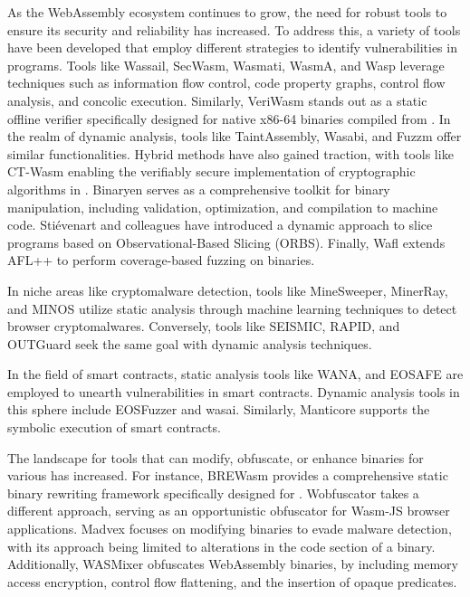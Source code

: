 \vspace{10mm}
As the WebAssembly ecosystem continues to grow, the need for robust tools to ensure its security and reliability has increased. 
To address this, a variety of tools have been developed that employ different strategies to identify vulnerabilities in \Wasm programs. 
Tools like Wassail\cite{wassail}, SecWasm\cite{secwasm}, Wasmati\cite{wasmati}, WasmA\cite{wasma}, and Wasp\cite{Wasp} leverage techniques such as information flow control, code property graphs, control flow analysis, and concolic execution. 
Similarly, VeriWasm\cite{veriwasm} stands out as a static offline verifier specifically designed for native x86-64 binaries compiled from \Wasm. 
In the realm of dynamic analysis, tools like TaintAssembly\cite{taintassembly}, Wasabi\cite{wasabi}, and Fuzzm\cite{fuzzm} offer similar functionalities. 
Hybrid methods have also gained traction, with tools like CT-Wasm\cite{ctwasm} enabling the verifiably secure implementation of cryptographic algorithms in \Wasm. 
Binaryen serves as a comprehensive toolkit for \Wasm binary manipulation, including validation, optimization, and compilation to machine code. 
Stiévenart and colleagues have introduced a dynamic approach to slice \Wasm programs based on Observational-Based Slicing (ORBS)\cite{slicing, slicing2}. 
Finally, Wafl\cite{wafl} extends AFL++ to perform coverage-based fuzzing on \Wasm binaries.


 In niche areas like cryptomalware detection, tools like MineSweeper\cite{Minesweeper}, MinerRay\cite{MinerRay}, and MINOS\cite{MINOS} utilize static analysis through machine learning techniques to detect browser cryptomalwares. 
Conversely, tools like SEISMIC\cite{SEISMIC}, RAPID\cite{RAPID}, and OUTGuard\cite{outguard} seek the same goal with dynamic analysis techniques.

 In the field of smart contracts, static analysis tools like WANA\cite{wana}, and EOSAFE\cite{eosafe} are employed to unearth vulnerabilities in \Wasm smart contracts. 
Dynamic analysis tools in this sphere include EOSFuzzer\cite{EOSFuzzer} and wasai\cite{wasai}.
Similarly, Manticore supports the symbolic execution of \wasm smart contracts. 


 The landscape for tools that can modify, obfuscate, or enhance \Wasm binaries for various has increased. 
For instance, BREWasm\cite{BREWasm} provides a comprehensive static binary rewriting framework specifically designed for \Wasm. 
Wobfuscator\cite{wobfuscator} takes a different approach, serving as an opportunistic obfuscator for Wasm-JS browser applications. 
Madvex\cite{madvex} focuses on modifying \Wasm binaries to evade malware detection, with its approach being limited to alterations in the code section of a \Wasm binary. 
Additionally, WASMixer\cite{wasmixer} obfuscates WebAssembly binaries, by including memory access encryption, control flow flattening, and the insertion of opaque predicates.



